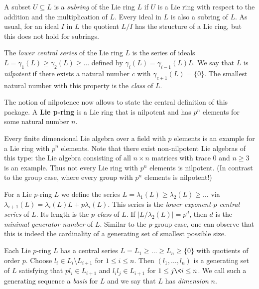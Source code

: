 A subset $U \subseteq L$ is a {\it subring} of the Lie ring $L$ if $U$
is a Lie ring with respect to the addition and the multiplication of $L$.
Every ideal in $L$ is also a subring of $L$. As usual, for an ideal $I$ in
$L$ the quotient $L/I$ has the structure of a Lie ring, but this does not
hold for subrings.
\medskip

The {\it lower central series} of the Lie ring $L$ is the series of ideals 
$L = \gamma_1(L) \geq \gamma_2(L) \geq \ldots$ defined by $\gamma_i(L)
= \gamma_{i-1}(L) L$. We say that $L$ is {\it nilpotent} if there exists a 
natural number $c$ with $\gamma_{c+1}(L) = \{0\}$. The smallest natural number 
with this property is the {\it class} of $L$.
\medskip

The notion of nilpotence now allows to state the central definition of 
this package. A {\bf Lie p-ring} is a Lie ring that is nilpotent and has 
$p^n$ elements for some natural number $n$. 
\medskip

Every finite dimensional Lie algebra over a field with $p$ elements 
is an example for a Lie ring with $p^n$ elements. Note that there exist
non-nilpotent Lie algebras of this type: the Lie algebra consisting of 
all $n \times n$ matrices with trace $0$ and $n \geq 3$ is an example. 
Thus not every Lie ring with $p^n$ elements is nilpotent. (In contrast
to the group case, where every group with $p^n$ elements is nilpotent!)
\medskip

For a Lie $p$-ring $L$ we define the series $L = \lambda_1(L) \geq 
\lambda_2(L) \geq \ldots$ 
via $\lambda_{i+1}(L) = \lambda_i(L) L + p \lambda_i(L)$. This 
series is the {\it lower exponent-$p$ central series} of $L$. Its length 
is the {\it $p$-class} of $L$. If $|L/\lambda_2(L)| = p^d$, then $d$ is 
the {\it minimal generator number} of $L$. Similar to the $p$-group case, 
one can observe that this is indeed the cardinality of a generating set 
of smallest possible size.
\medskip

Each Lie $p$-ring $L$ has a central series $L = L_1 \geq \ldots \geq L_n 
\geq \{0\}$ with quotients of order $p$. Choose $l_i \in L_i \setminus 
L_{i+1}$ for $1 \leq i \leq n$. Then $(l_1, \ldots, l_n)$ is a generating 
set of $L$ satisfying that $p l_i \in L_{i+1}$ and $l_i l_j 
\in L_{i+1}$ for $1 \leq j \< i \leq n$. We call such a generating sequence 
a {\it basis} for $L$ and we say that $L$ has {\it dimension} $n$.


